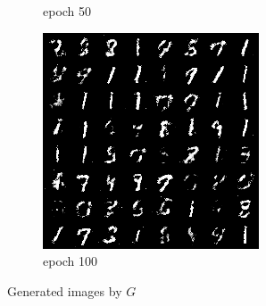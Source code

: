 \documentclass[a4paper]{article}
\theoremstyle{definition}
\newenvironment{soln}{
	\leavevmode\color{blue}\ignorespaces
}{}
\begin{document}
\begin{enumerate} [label=(\alph*)]
\begin{soln}
\begin{figure}[H]
\begin{subfigure}[b]{0.3\textwidth}
				\caption{epoch 50}
			\end{subfigure}
			\hfill
			\begin{subfigure}[b]{0.3\textwidth}
				\centering
				\includegraphics[width=\textwidth]{images/q1c_gen_img100.png}
				\caption{epoch 100}
			\end{subfigure}
			\caption{Generated images by $G$}
			\label{fig:three graphs}
		\end{figure}
        \end{soln}
		
	\end{enumerate}

\newpage
\end{document}
